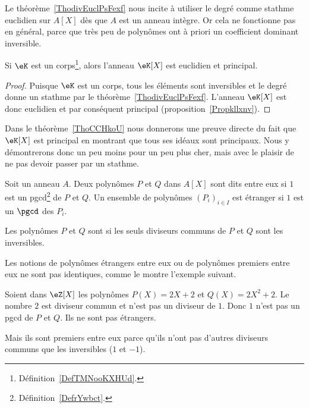 \begin{normaltext}
	Le théorème~\ref{ThodivEuclPsFexf} nous incite à utiliser le degré comme stathme euclidien sur \( A[X]\) dès que \( A\) est un anneau intègre. Or cela ne fonctionne pas en général, parce que très peu de polynômes ont à priori un coefficient dominant inversible.
\end{normaltext}

\begin{lemma}       \label{LEMooIDSKooQfkeKp}
	Si \( \eK\) est un corps\footnote{Définition~\ref{DefTMNooKXHUd}.}, alors l'anneau \( \eK[X]\) est euclidien et principal.
\end{lemma}

\begin{proof}
	Puisque \( \eK\) est un corps, tous les éléments sont inversibles et le degré donne un stathme par le théorème~\ref{ThodivEuclPsFexf}. L'anneau \( \eK[X]\) est donc euclidien et par conséquent principal (proposition~\ref{Propkllxnv}).
\end{proof}

Dans le théorème~\ref{ThoCCHkoU} nous donnerons une preuve directe du fait que \( \eK[X]\) est principal en montrant que tous ses idéaux sont principaux. Nous y démontrerons donc un peu moins pour un peu plus cher, mais avec le plaisir de ne pas devoir passer par un stathme.

\begin{definition}  \label{DefDSFooZVbNAX}
	Soit un anneau \( A\). Deux polynômes \( P\) et \( Q\) dans \( A[X]\) sont dits  entre eux si \( 1\) est un pgcd\footnote{Définition~\ref{DefrYwbct}.} de \( P\) et \( Q\). Un ensemble de polynômes \( (P_i)_{i\in I}\) est étranger  si \( 1\) est un \( \pgcd\) des \( P_i\).

	Les polynômes \( P\) et \( Q\) sont  si les seuls diviseurs communs de \( P\) et \( Q\) sont les inversibles.
\end{definition}

Les notions de polynômes étrangers entre eux ou de polynômes premiers entre eux ne sont pas identiques, comme le montre l'exemple suivant.

\begin{example}
	Soient dans \( \eZ[X]\) les polynômes \( P(X)=2X+2\) et \( Q(X)=2X^2+2\). Le nombre \( 2\) est diviseur commun et n'est pas un diviseur de \( 1\). Donc \( 1\) n'est pas un pgcd de \( P\) et \( Q\). Ils ne sont pas étrangers.

	Mais ils sont premiers entre eux parce qu'ils n'ont pas d'autres diviseurs communs que les inversibles (\( 1\) et \( -1\)).
\end{example}


